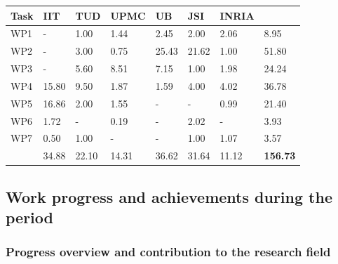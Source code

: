 \documentclass[12pt,a4paper,twoside]{article}
\begin{document}
\begin{longtable}{|C{1.5cm}|C{1.5cm}|C{1.5cm}|C{1.5cm}|C{1.5cm}|C{1.5cm}|C{1.5cm}|C{1.5cm}|}
\footnotesize \textbf{Task}& \footnotesize \textbf{IIT}&\footnotesize \textbf{TUD}&\footnotesize \textbf{UPMC}& \footnotesize \textbf{UB} &\footnotesize \textbf{JSI} &\footnotesize \textbf{INRIA} &  \\ \hline
\footnotesize WP1      &  -     &  1.00 &  1.44 &  2.45  &  2.00  &  2.06 & 8.95  \\  \hline
\footnotesize WP2      &  -     &  3.00 &  0.75 &  25.43 &  21.62 &  1.00 & 51.80 \\  \hline
\footnotesize WP3      &  -     &  5.60 &  8.51 &  7.15  &  1.00  &  1.98 & 24.24 \\   \hline
\footnotesize WP4      &  15.80 &  9.50 &  1.87 &  1.59  &  4.00  &  4.02 & 36.78 \\   \hline
\footnotesize WP5      &  16.86 &  2.00 &  1.55 &  -     &  -     &  0.99 & 21.40 \\  \hline
\footnotesize WP6      &  1.72  &  -    &  0.19 &  -     &  2.02  &  -    & 3.93  \\  \hline
\footnotesize WP7      &  0.50  &  1.00 &  -    &  -     &  1.00  &  1.07 & 3.57  \\  \hline
{}  &  34.88 &	22.10	& 14.31	& 36.62	 &  31.64	& 11.12 &  \textbf{156.73}     \\  
\end{longtable}











\subsection{Work progress and achievements during the period}

\subsubsection{Progress overview and contribution to the research field}
\end{document}
